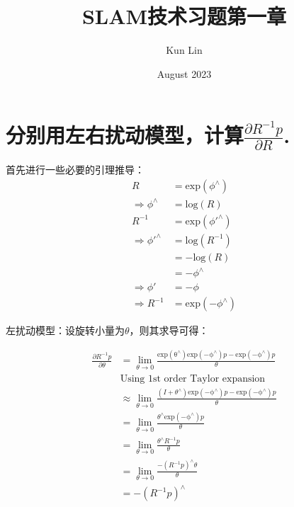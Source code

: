 \documentclass{article}
\title{SLAM技术习题第一章}
\author{Kun Lin}
\date{August 2023}
\begin{document}
\maketitle
\section{分别用左右扰动模型，计算$\frac{\partial R^{-1}p}{\partial R}$.}
首先进行一些必要的引理推导：
\begin{equation*}
\begin{aligned}
R &= \mathrm{exp}(\phi^{\wedge}) \\
\Rightarrow \phi^{\wedge} &= \mathrm{log}(R)\\
R^{-1}
    &= \mathrm{exp}(\phi'^{\wedge}) \\
\Rightarrow \phi'^{\wedge}
    &= \mathrm{log}(R^{-1}) \\
    &=-\mathrm{log}(R) \\
    &=-\phi^{\wedge} \\
\Rightarrow \phi'
    &= -\phi \\
\Rightarrow R^{-1} &= \mathrm{exp}(-\phi^{\wedge})
\end{aligned}
\end{equation*}

左扰动模型：设旋转小量为$\theta$，则其求导可得：

\begin{equation*}
\begin{aligned}
\frac{\partial R^{-1}p}{\partial \theta}
    &= \lim\limits_{\theta\to 0}
        \frac
            {\mathrm{exp(\theta^{\wedge})}\mathrm{exp(-\phi^{\wedge})}p - \mathrm{exp(-\phi^{\wedge})}p}
            {\theta} \\
    &\text{Using 1st order Taylor expansion} \\
    &\approx \lim\limits_{\theta\to 0}
        \frac
            {(I+\theta^{\wedge})\mathrm{exp(-\phi^{\wedge})}p - \mathrm{exp(-\phi^{\wedge})}p}
            {\theta} \\
    &= \lim\limits_{\theta\to 0}
        \frac
            {\theta^{\wedge}\mathrm{exp(-\phi^{\wedge})}p}
            {\theta} \\
    &= \lim\limits_{\theta\to 0}
        \frac
            {\theta^{\wedge}R^{-1}p}
            {\theta} \\
    &= \lim\limits_{\theta\to 0}
        \frac
            {-(R^{-1}p)^{\wedge}\theta}
            {\theta} \\
    &= -(R^{-1}p)^{\wedge}
\end{aligned}
\end{equation*}
\end{document}
